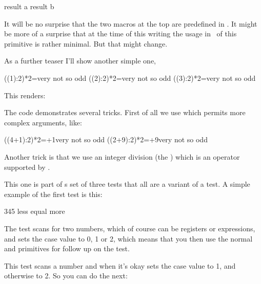 \ifcondition\ifwhatever{10pt}
    result a
\else
    result b
\fi
\stoptyping

It will be no surprise that the two macros at the top are predefined in \CONTEXT.
It might be more of a surprise that at the time of this writing the usage in
\CONTEXT\ of this \type {\ifcondition} primitive is rather minimal. But that
might change.

As a further teaser I'll show another simple one,

\startbuffer
\def\HowOdd#1{\unless\ifnum\numexpr ((#1):2)*2\relax=\numexpr#1\relax}

\ifcondition\HowOdd{1}very \else not so \fi odd
\ifcondition\HowOdd{2}very \else not so \fi odd
\ifcondition\HowOdd{3}very \else not so \fi odd
\stopbuffer

\typebuffer[option=TEX]

This renders:

\startlines
\getbuffer
\stoplines

The code demonstrates several tricks. First of all we use \type {\numexpr} which
permits more complex arguments, like:

\starttyping[option=TEX]
\ifcondition\HowOdd{4+1}very \else not so \fi odd
\ifcondition\HowOdd{2\scratchcounter+9}very \else not so \fi odd
\stoptyping

Another trick is that we use an integer division (the \type {:}) which is an
operator supported by \LUAMETATEX .

\stopsectionlevel

\stopsectionlevel

\startsectionlevel[title={\LUAMETATEX\ primitives}]

\startsectionlevel[title={\tex{ifcmpnum}}]

This one is part of s set of three tests that all are a variant of a \type
{\ifcase} test. A simple example of the first test is this:

\starttyping[option=TEX]
 345 less \or equal \else more \fi
\stoptyping

The test scans for two numbers, which of course can be registers or expressions,
and sets the case value to 0, 1 or 2, which means that you then use the normal
\type {\or} and \type {\else} primitives for follow up on the test.

\stopsectionlevel

\startsectionlevel[title={\tex{ifchknum}}]

This test scans a number and when it's okay sets the case value to 1, and otherwise
to 2. So you can do the next:

